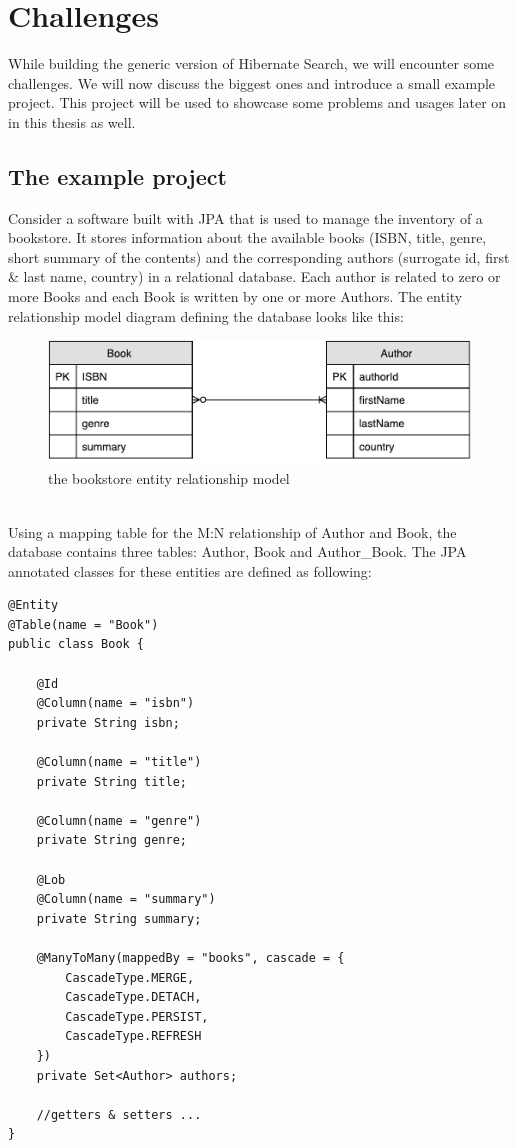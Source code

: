 \section{Challenges}\label{Challenges}
While building the generic version of Hibernate Search, we will encounter some challenges. We will now discuss the biggest ones and introduce a small example project. This project will be used to showcase some problems and usages later on in this thesis as well.

\subsection{The example project} \label{example_project}
Consider a software built with JPA that is used to manage the inventory of a bookstore. It stores information about the available books (ISBN, title, genre, short summary of the contents) and the corresponding authors (surrogate id, first \& last name, country) in a relational database. Each author is related to zero or more Books and each Book is written by one or more Authors. The entity relationship model diagram defining the database looks like this:
\\
\begin{figure}[ht]
	\centering
	\includegraphics[scale = 0.9]{images/Sample_Project_ER.pdf}
	\caption{the bookstore entity relationship model}
	\label{fig3}
\end{figure}
\\
Using a mapping table for the M:N relationship of Author and Book, the database contains three tables: Author, Book and Author\_Book. The JPA annotated classes for these entities are defined as following:
\\
\lstset{language=java}
\begin{lstlisting}[frame=htrbl, caption={Book.java}, label={lst:book.java_1}]
@Entity
@Table(name = "Book")
public class Book {

	@Id
	@Column(name = "isbn")
	private String isbn;
	
	@Column(name = "title")
	private String title;
	
	@Column(name = "genre")
	private String genre;
	
	@Lob
	@Column(name = "summary")
	private String summary;
	
	@ManyToMany(mappedBy = "books", cascade = {
		CascadeType.MERGE,
		CascadeType.DETACH,
		CascadeType.PERSIST,
		CascadeType.REFRESH
	})
	private Set<Author> authors;
	
	//getters & setters ...
}
\end{lstlisting}

